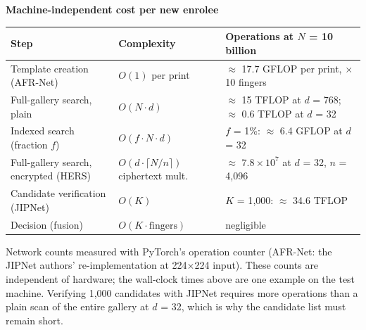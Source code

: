 \documentclass[10pt,a4paper]{article}
\begin{document}
\textbf{Machine-independent cost per new enrolee}\par
\begin{tabularx}{\textwidth}{@{}>{\raggedright}p{4.6cm}>{\raggedright}p{4.4cm}>{\raggedright\arraybackslash}X@{}}\toprule
\textbf{Step} & \textbf{Complexity} & \textbf{Operations at $N$ = 10 billion}\\\midrule
Template creation (AFR-Net) & $O(1)$ per print & $\approx$ 17.7 GFLOP per print, $\times$ 10 fingers\\
Full-gallery search, plain & $O(N\cdot d)$ & $\approx$ 15 TFLOP at $d$ = 768; $\approx$ 0.6 TFLOP at $d$ = 32\\
Indexed search (fraction $f$) & $O(f\cdot N\cdot d)$ & $f$ = 1\%: $\approx$ 6.4 GFLOP at $d$ = 32\\
Full-gallery search, encrypted (HERS) & $O(d\cdot\lceil N/n\rceil)$ ciphertext mult. & $\approx$ $7.8 \times 10^{7}$ at $d$ = 32, $n$ = 4{,}096\\
Candidate verification (JIPNet) & $O(K)$ & $K$ = 1{,}000: $\approx$ 34.6 TFLOP\\
Decision (fusion) & $O(K\cdot\mathrm{fingers})$ & negligible\\\bottomrule
\end{tabularx}
{\footnotesize Network counts measured with PyTorch's operation counter (AFR-Net: the JIPNet authors' re-implementation at 224$\times$224 input). These counts are independent of hardware; the wall-clock times above are one example on the test machine. Verifying 1{,}000 candidates with JIPNet requires more operations than a plain scan of the entire gallery at $d$ = 32, which is why the candidate list must remain short.\par}
\end{document}
